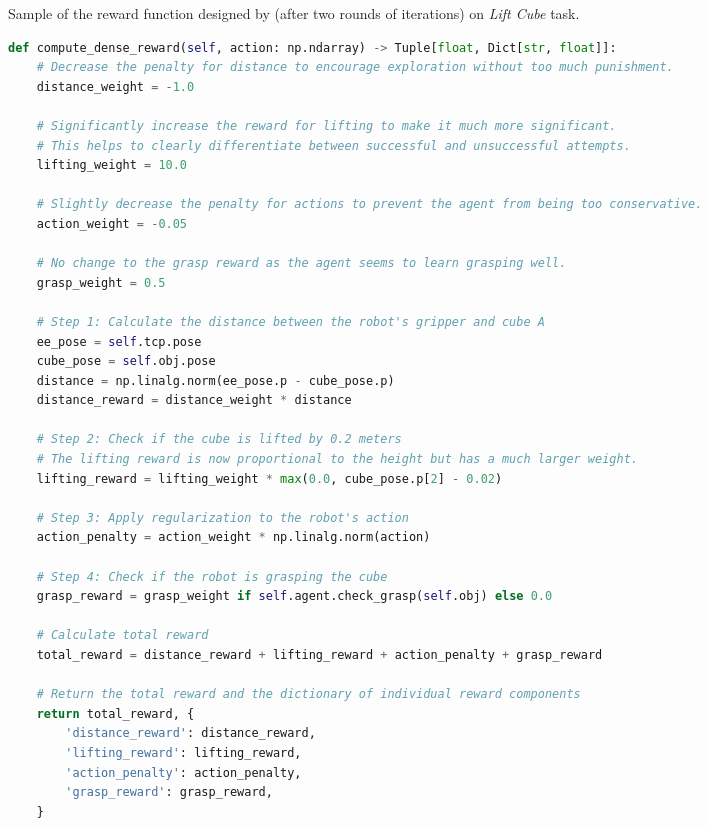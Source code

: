\documentclass{article}
\theoremstyle{plain}
\theoremstyle{definition}
\theoremstyle{remark}
\begin{document}
\begin{table}[!ht]
\centering
\caption{Sample of the reward function designed by \ourmethod (after two rounds of iterations) on \MS \textit{Lift Cube} task.}
\begin{tcolorbox}
\begin{lstlisting}[language=python,breaklines]
def compute_dense_reward(self, action: np.ndarray) -> Tuple[float, Dict[str, float]]:
    # Decrease the penalty for distance to encourage exploration without too much punishment.
    distance_weight = -1.0

    # Significantly increase the reward for lifting to make it much more significant.
    # This helps to clearly differentiate between successful and unsuccessful attempts.
    lifting_weight = 10.0

    # Slightly decrease the penalty for actions to prevent the agent from being too conservative.
    action_weight = -0.05

    # No change to the grasp reward as the agent seems to learn grasping well.
    grasp_weight = 0.5

    # Step 1: Calculate the distance between the robot's gripper and cube A
    ee_pose = self.tcp.pose
    cube_pose = self.obj.pose
    distance = np.linalg.norm(ee_pose.p - cube_pose.p)
    distance_reward = distance_weight * distance

    # Step 2: Check if the cube is lifted by 0.2 meters
    # The lifting reward is now proportional to the height but has a much larger weight.
    lifting_reward = lifting_weight * max(0.0, cube_pose.p[2] - 0.02)

    # Step 3: Apply regularization to the robot's action
    action_penalty = action_weight * np.linalg.norm(action)

    # Step 4: Check if the robot is grasping the cube
    grasp_reward = grasp_weight if self.agent.check_grasp(self.obj) else 0.0

    # Calculate total reward
    total_reward = distance_reward + lifting_reward + action_penalty + grasp_reward

    # Return the total reward and the dictionary of individual reward components
    return total_reward, {
        'distance_reward': distance_reward,
        'lifting_reward': lifting_reward,
        'action_penalty': action_penalty,
        'grasp_reward': grasp_reward,
    }
\end{lstlisting}
\end{tcolorbox}
\label{tab:ourmethod_code_liftcube}
\end{table}
\end{document}
